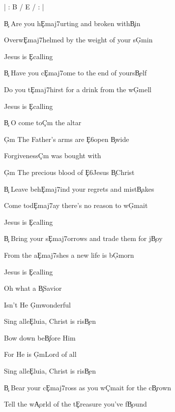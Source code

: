 \documentclass[9pt]{extarticle}
\begin{document}
\bsong

\bi
| : B / E / : |
\ei

\bv
\c{B} Are you h\c{Emaj7}urting and broken with\c{B}in

Overw\c{Emaj7}helmed by the weight of your s\c{G\s m}in

Jesus is \c{E}calling

\c{B} Have you c\c{Emaj7}ome to the end of yours\c{B}elf

Do you t\c{Emaj7}hirst for a drink from the w\c{G\s m}ell

Jesus is \c{E}calling
\ev

\bc
\c{B} O come to\c{C\s m} the altar

\c{G\s m} The Father's arms are \c{E6}open \c{B}wide

Forgiveness\c{C\s m} was bought with

\c{G\s m} The precious blood of \c{E6}Jesus \c{B}Christ
\ec

\bv
\c{B} Leave beh\c{Emaj7}ind your regrets and mist\c{B}akes

Come tod\c{Emaj7}ay there's no reason to w\c{G\s m}ait

Jesus is \c{E}calling

\c{B} Bring your s\c{Emaj7}orrows and trade them for j\c{B}oy

From the a\c{Emaj7}shes a new life is b\c{G\s m}orn

Jesus is \c{E}calling
\ev


\bb[2]
Oh what a \c{B}Savior

Isn't He \c{G\s m}wonderful

Sing alle\c{E}luia, Christ is ris\c{B}en

Bow down be\c{B}fore Him

For He is \c{G\s m}Lord of all

Sing alle\c{E}luia, Christ is ris\c{B}en
\eb


\bo
\c{B} Bear your c\c{Emaj7}ross as you w\c{C\s m}ait for the c\c{B}rown

Tell the w\c{A}orld of the t\c{E}reasure you've f\c{B}ound
\eo

\esong
\end{document}

